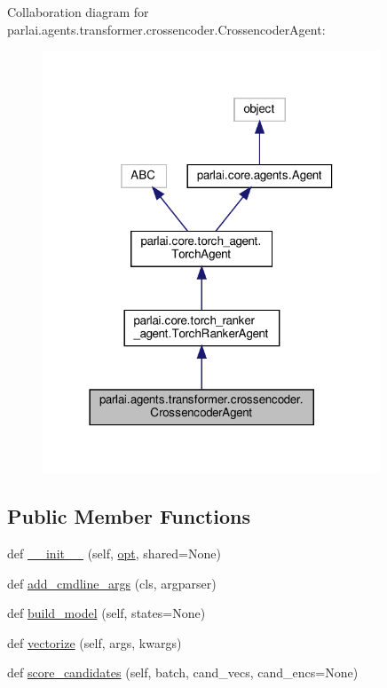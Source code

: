 Collaboration diagram for parlai.\+agents.\+transformer.\+crossencoder.\+Crossencoder\+Agent\+:
\nopagebreak
\begin{figure}[H]
\begin{center}
\leavevmode
\includegraphics[width=285pt]{da/db5/classparlai_1_1agents_1_1transformer_1_1crossencoder_1_1CrossencoderAgent__coll__graph}
\end{center}
\end{figure}
\subsection*{Public Member Functions}
\begin{DoxyCompactItemize}
\item 
def \hyperlink{classparlai_1_1agents_1_1transformer_1_1crossencoder_1_1CrossencoderAgent_a22295a739ff290d96c45efd0bfd550bb}{\+\_\+\+\_\+init\+\_\+\+\_\+} (self, \hyperlink{classparlai_1_1core_1_1torch__agent_1_1TorchAgent_a785bb920cf8c8afc3e9bf6a8b77e335a}{opt}, shared=None)
\item 
def \hyperlink{classparlai_1_1agents_1_1transformer_1_1crossencoder_1_1CrossencoderAgent_a931cdceebd1eceb9c20638271c86af7a}{add\+\_\+cmdline\+\_\+args} (cls, argparser)
\item 
def \hyperlink{classparlai_1_1agents_1_1transformer_1_1crossencoder_1_1CrossencoderAgent_af63326f1f4d295e7a1a7fad4b07e077d}{build\+\_\+model} (self, states=None)
\item 
def \hyperlink{classparlai_1_1agents_1_1transformer_1_1crossencoder_1_1CrossencoderAgent_a736057f000f0d4cdb5d006e10c4291db}{vectorize} (self, args, kwargs)
\item 
def \hyperlink{classparlai_1_1agents_1_1transformer_1_1crossencoder_1_1CrossencoderAgent_a5c286ce0bc163e443e73182f95d6e0c6}{score\+\_\+candidates} (self, batch, cand\+\_\+vecs, cand\+\_\+encs=None)
\end{DoxyCompactItemize}
